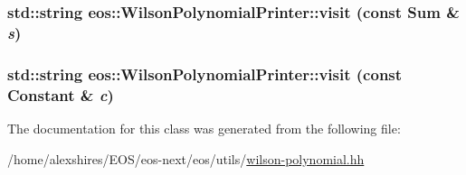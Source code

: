 \label{classeos_1_1WilsonPolynomialPrinter_af1f56261d6e1fe1e9b78cf1f6f1c0555}
\hypertarget{classeos_1_1WilsonPolynomialPrinter_a203b4d50f4295a05bf382238bf2fa0cc}{
\subsubsection[{visit}]{\setlength{\rightskip}{0pt plus 5cm}std::string eos::WilsonPolynomialPrinter::visit (const Sum \& {\em s})}}
\label{classeos_1_1WilsonPolynomialPrinter_a203b4d50f4295a05bf382238bf2fa0cc}
\hypertarget{classeos_1_1WilsonPolynomialPrinter_a16734adc9f8e5ed38f98dec2fe7f1082}{
\subsubsection[{visit}]{\setlength{\rightskip}{0pt plus 5cm}std::string eos::WilsonPolynomialPrinter::visit (const Constant \& {\em c})}}
\label{classeos_1_1WilsonPolynomialPrinter_a16734adc9f8e5ed38f98dec2fe7f1082}


The documentation for this class was generated from the following file:\begin{DoxyCompactItemize}
\item 
/home/alexshires/EOS/eos-\/next/eos/utils/\hyperlink{wilson-polynomial_8hh}{wilson-\/polynomial.hh}\end{DoxyCompactItemize}
